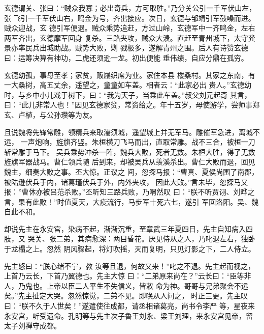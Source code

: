 \documentclass[UTF8,12pt,twoside,a4paper]{ctexart} %
\begin{document}
\begin{flushleft}
    玄德谓关、张曰：“贼众我寡；必出奇兵，方可取胜。”乃分关公引一千军伏山左，张
飞引一千军伏山右，鸣金为号，齐出接应。次日，玄德与邹靖引军鼓噪而进。贼众迎战，玄
德引军便退。贼众乘势追赶，方过山岭，玄德军中一齐鸣金，左右两军齐出，玄德摩军回身
复杀。三路夹攻，贼众大溃。直赶至青州城下，太守龚景亦率民兵出城助战。贼势大败，剿
戮极多，遂解青州之围。后人有诗赞玄德曰：运筹决算有神功，二虎还须逊一龙。初出便能
垂伟绩，自应分鼎在孤穷。


玄德幼孤，事母至孝；家贫，贩屦织席为业。家住本县
楼桑村。其家之东南，有一大桑树，高五丈余，遥望之，童童如车盖。相者云：“此家必出
贵人。”玄德幼时，与乡中小儿戏于树下，曰：“我为天子，当乘此车盖。”叔父刘元起奇
其言，曰：“此儿非常人也！”因见玄德家贫，常资给之。年十五岁，母使游学，尝师事郑
玄、卢植，与公孙瓒等为友。

\end{flushleft}

\clearpage{\pagestyle{empty}\cleardoublepage}%



	\begin{center}
	\end{center}
\vspace*{10pt}

\songti {}
\hspace{1.6em}
\indent\setlength{\parindent}{2em}%

且说魏将先锋常雕，领精兵来取濡须城，遥望城上并无军马。雕催军急进，离城不远，
一声炮响，旌旗齐竖。朱桓横刀飞马而出，直取常雕。战不三合，被桓一刀斩常雕于马下。
吴兵乘势冲杀一阵，魏兵大败，死者无数。朱桓大胜，得了无数旌旗军器战马。曹仁领兵随
后到来，却被吴兵从羡溪杀出。曹仁大败而退，回见魏主，细奏大败之事。丕大惊。正议之
间，忽探马报：“曹真、夏侯尚围了南郡，被陆逊伏兵于内，诸葛瑾伏兵于外，内外夹攻，
因此大败。”言未毕，忽探马又报：”曹休亦被吕范杀败。”丕听知三路兵败，乃喟然叹
曰：“朕不听贾诩、刘晔之言，果有此败！”时值夏天，大疫流行，马步军十死六七，遂引
军回洛阳。吴、魏自此不和。

却说先主在永安宫，染病不起，渐渐沉重，至章武三年夏四日，先主自知病入四肢，又
哭关、张二弟，其病愈深：两目昏花。厌见侍从之人，乃叱退左右，独卧于龙榻之上。忽然
阴风骤起，将灯吹摇，灭而复明，只见灯影之下，二人侍立。

先主怒曰：“朕心绪不宁，教
汝等且退，何故又来！”叱之不退。先主起而视之，上首乃云长，下首乃翼德也。先主大惊
曰：“二弟原来尚在？”云长曰：“臣等非人，乃鬼也。上帝以臣二人平生不失信义，皆敕
命为神。哥哥与兄弟聚会不远矣。”先主扯定大哭。忽然惊觉，二弟不见。即唤从人问之，
时正三更。先主叹曰：“朕不久于人世矣！”遂遣使往成都，请丞相诸葛亮，尚书令李严
等，星夜来永安宫，听受遗命。孔明等与先主次子鲁王刘永、梁王刘理，来永安宫见帝，留
太子刘禅守成都。
\end{document}
